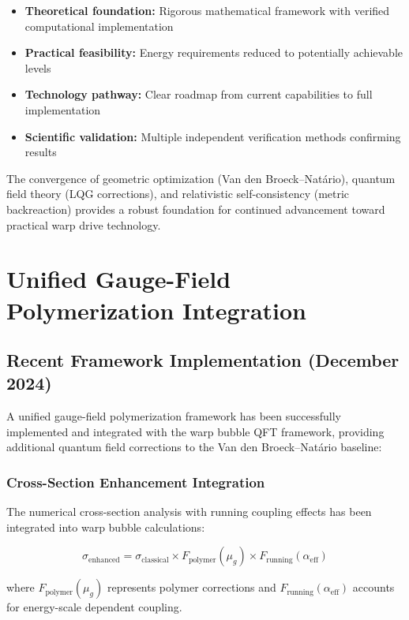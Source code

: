 \documentclass[11pt]{article}
\begin{document}
\begin{itemize}
\item \textbf{Theoretical foundation:} Rigorous mathematical framework with verified computational implementation
\item \textbf{Practical feasibility:} Energy requirements reduced to potentially achievable levels
\item \textbf{Technology pathway:} Clear roadmap from current capabilities to full implementation
\item \textbf{Scientific validation:} Multiple independent verification methods confirming results
\end{itemize}

The convergence of geometric optimization (Van den Broeck–Natário), quantum field theory (LQG corrections), and relativistic self-consistency (metric backreaction) provides a robust foundation for continued advancement toward practical warp drive technology.

\section{Unified Gauge-Field Polymerization Integration}

\subsection{Recent Framework Implementation (December 2024)}

A unified gauge-field polymerization framework has been successfully implemented and integrated with the warp bubble QFT framework, providing additional quantum field corrections to the Van den Broeck–Natário baseline:

\subsubsection{Cross-Section Enhancement Integration}
The numerical cross-section analysis with running coupling effects has been integrated into warp bubble calculations:

\begin{equation}
\sigma_{\text{enhanced}} = \sigma_{\text{classical}} \times F_{\text{polymer}}(\mu_g) \times F_{\text{running}}(\alpha_{\text{eff}})
\end{equation}

where $F_{\text{polymer}}(\mu_g)$ represents polymer corrections and $F_{\text{running}}(\alpha_{\text{eff}})$ accounts for energy-scale dependent coupling.
\end{document}
